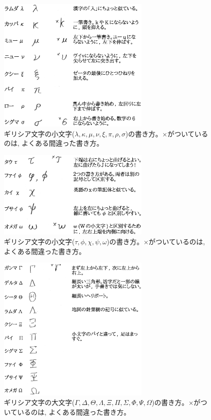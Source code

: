 \begin{figure}[H]
    \centering
    \includegraphics[width=7.5cm]{Greece2.eps}
    \caption{ギリシア文字の小文字($\lambda, \kappa, \mu, \nu, \xi, \pi, \rho, \sigma$)の書き方。$\times$がついているのは, よくある間違った書き方。\label{fig:Greece2}}
\end{figure}

\begin{figure}[H]
    \centering
    \includegraphics[width=7.5cm]{Greece3.eps}
    \caption{ギリシア文字の小文字($\tau, \phi, \chi, \psi, \omega$)の書き方。$\times$がついているのは, よくある間違った書き方。\label{fig:Greece3}}
\end{figure}

\begin{figure}[H]
    \centering
    \includegraphics[width=7.5cm]{Greece4.eps}
    \caption{ギリシア文字の大文字($\Gamma, \Delta, \Theta, \Lambda, \Xi, \Pi, \Sigma, \Phi, \Psi, \Omega$)の書き方。$\times$がついているのは, よくある間違った書き方。\label{fig:Greece4}}
\end{figure}

